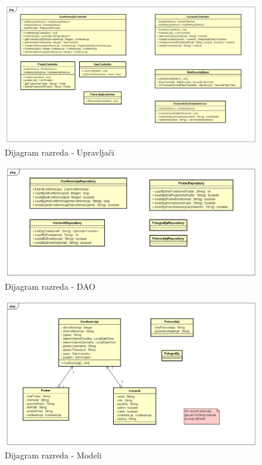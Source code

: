 			\begin{figure} [hbt!]
				\includegraphics[width=\linewidth]{Slike/ClassDiagramControllerPremaKodu}
				\caption{Dijagram razreda - Upravljači}
			\end{figure}
			
			\begin{figure} [hbt!]
				\includegraphics[width=\linewidth]{Slike/ClassDiagramRepositoryPremaKodu}
				\caption{Dijagram razreda - DAO}
			\end{figure}
			
			\begin{figure} [hbt!]
				\includegraphics[width=\linewidth]{Slike/ClassDiagramModelPremaKodu}
				\caption{Dijagram razreda - Modeli}
			\end{figure}
			
